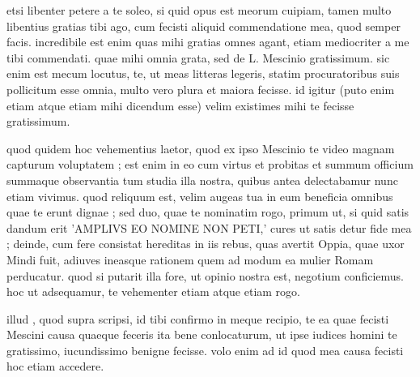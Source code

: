 


 etsi libenter petere a te soleo, si quid opus est meorum cuipiam, tamen multo libentius gratias tibi ago, cum fecisti aliquid commendatione mea, quod semper facis. incredibile est enim quas mihi gratias omnes agant, etiam mediocriter a me tibi commendati. quae mihi omnia grata, sed de L. Mescinio gratissimum. sic enim est mecum locutus, te, ut meas litteras legeris, statim procuratoribus suis pollicitum esse omnia, multo vero plura et maiora fecisse. id igitur (puto enim etiam atque etiam mihi dicendum esse) velim existimes mihi te fecisse gratissimum.

 quod quidem hoc vehementius laetor, quod ex ipso Mescinio te video magnam capturum voluptatem ; est enim in eo cum virtus et probitas et summum officium summaque observantia tum studia illa nostra, quibus antea delectabamur nunc etiam vivimus. quod reliquum est, velim augeas tua in eum beneficia omnibus quae te erunt dignae ; sed duo, quae te nominatim rogo, primum ut, si quid satis dandum erit 'AMPLIVS EO NOMINE NON PETI,' cures ut satis detur fide mea ; deinde, cum fere consistat hereditas in iis rebus, quas avertit Oppia, quae uxor Mindi fuit, adiuves ineasque rationem quem ad modum ea mulier Romam perducatur. quod si putarit illa fore, ut opinio nostra est, negotium conficiemus. hoc ut adsequamur, te vehementer etiam atque etiam rogo.

 illud , quod supra scripsi, id tibi confirmo in meque recipio, te ea quae fecisti Mescini causa quaeque feceris ita bene conlocaturum, ut ipse iudices homini te gratissimo, iucundissimo benigne fecisse. volo enim ad id quod mea causa fecisti hoc etiam accedere.

